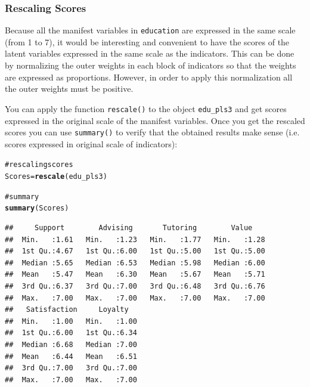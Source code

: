 \documentclass[12pt]{book}\usepackage{graphicx, color}
\makeatletter
\newcommand{\hlfunctioncall}[1]{\textcolor[rgb]{0.501960784313725,0,0.329411764705882}{\textbf{#1}}}%
\newcommand{\hlcomment}[1]{\textcolor[rgb]{0.180392156862745,0.6,0.341176470588235}{#1}}%
\newenvironment{kframe}{%
 \def\at@end@of@kframe{}%
 \ifinner\ifhmode%
  \def\at@end@of@kframe{\end{minipage}}%
  \begin{minipage}{\columnwidth}%
 \fi\fi%
 \def\FrameCommand##1{\hskip\@totalleftmargin \hskip-\fboxsep
 \colorbox{shadecolor}{##1}\hskip-\fboxsep
     \hskip-\linewidth \hskip-\@totalleftmargin \hskip\columnwidth}%
 \MakeFramed {\advance\hsize-\width
   \@totalleftmargin\z@ \linewidth\hsize
   \@setminipage}}%
 {\par\unskip\endMakeFramed%
 \at@end@of@kframe}
\newenvironment{knitrout}{}{} %
\newcommand{\code}[1]{\texttt{#1}}
\makeatother
\begin{document}
\subsubsection*{Rescaling Scores}
Because all the manifest variables in \code{education} are expressed in the same scale (from 1 to 7), it would be interesting and convenient to have the scores of the latent variables expressed in the same scale as the indicators. This can be done by normalizing the outer weights in each block of indicators so that the weights are expressed as proportions. However, in order to apply this normalization all the outer weights must be positive.

You can apply the function \code{rescale()} to the object \code{edu\_pls3} and get scores expressed in the original scale of the manifest variables. Once you get the rescaled scores you can use \code{summary()} to verify that the obtained results make sense (i.e. scores expressed in original scale of indicators):
\begin{knitrout}
\color{fgcolor}\begin{kframe}
\begin{alltt}
\hlcomment{# rescaling scores}
Scores = \hlfunctioncall{rescale}(edu_pls3)

\hlcomment{# summary}
\hlfunctioncall{summary}(Scores)
\end{alltt}
\begin{verbatim}
##     Support        Advising       Tutoring        Value     
##  Min.   :1.61   Min.   :1.23   Min.   :1.77   Min.   :1.28  
##  1st Qu.:4.67   1st Qu.:6.00   1st Qu.:5.00   1st Qu.:5.00  
##  Median :5.65   Median :6.53   Median :5.98   Median :6.00  
##  Mean   :5.47   Mean   :6.30   Mean   :5.67   Mean   :5.71  
##  3rd Qu.:6.37   3rd Qu.:7.00   3rd Qu.:6.48   3rd Qu.:6.76  
##  Max.   :7.00   Max.   :7.00   Max.   :7.00   Max.   :7.00  
##   Satisfaction     Loyalty    
##  Min.   :1.00   Min.   :1.00  
##  1st Qu.:6.00   1st Qu.:6.34  
##  Median :6.68   Median :7.00  
##  Mean   :6.44   Mean   :6.51  
##  3rd Qu.:7.00   3rd Qu.:7.00  
##  Max.   :7.00   Max.   :7.00
\end{verbatim}
\end{kframe}
\end{knitrout}
\end{document}
